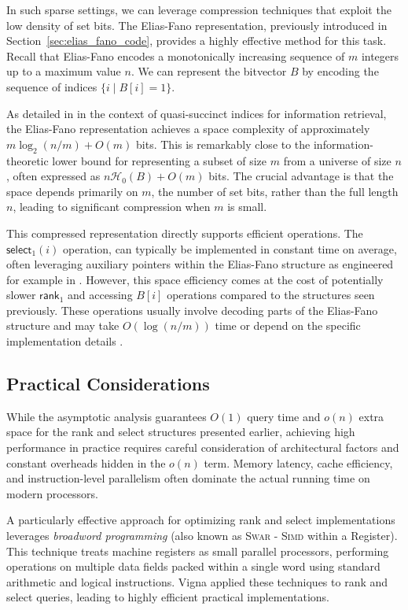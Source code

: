 In such sparse settings, we can leverage compression techniques that exploit the low density of set bits. The Elias-Fano representation, previously introduced in Section~\ref{sec:elias_fano_code}, provides a highly effective method for this task. Recall that Elias-Fano encodes a monotonically increasing sequence of $m$ integers up to a maximum value $n$. We can represent the bitvector $B$ by encoding the sequence of indices $\{ i \mid B[i]=1 \}$.

As detailed in \cite{vigna2013quasi} in the context of quasi-succinct indices for information retrieval, the Elias-Fano representation achieves a space complexity of approximately $m \log_2(n/m) + O(m)$ bits. This is remarkably close to the information-theoretic lower bound for representing a subset of size $m$ from a universe of size $n$, often expressed as $n\mathcal{H}_0(B) + O(m)$ bits. The crucial advantage is that the space depends primarily on $m$, the number of set bits, rather than the full length $n$, leading to significant compression when $m$ is small.

This compressed representation directly supports efficient operations. The $\textsf{select}_1(i)$ operation, can typically be implemented in constant time on average, often leveraging auxiliary pointers within the Elias-Fano structure as engineered for example in \cite{vigna2013quasi}. However, this space efficiency comes at the cost of potentially slower $\textsf{rank}_1$ and accessing $B[i]$ operations compared to the structures seen previously. These operations usually involve decoding parts of the Elias-Fano structure and may take $O(\log(n/m))$ time or depend on the specific implementation details \cite{navarro2016compact}.

\subsection{Practical Considerations} \label{subsec:practical_considerations}

While the asymptotic analysis guarantees $O(1)$ query time and $o(n)$ extra space for the \textsf{rank} and \textsf{select} structures presented earlier, achieving high performance in practice requires careful consideration of architectural factors and constant overheads hidden in the $o(n)$ term. Memory latency, cache efficiency, and instruction-level parallelism often dominate the actual running time on modern processors.

A particularly effective approach for optimizing \textsf{rank} and \textsf{select} implementations leverages \emph{broadword programming} (also known as \textsc{Swar} - \textsc{Simd} within a Register). This technique treats machine registers as small parallel processors, performing operations on multiple data fields packed within a single word using standard arithmetic and logical instructions. Vigna \cite{vigna2008broadword} applied these techniques to \textsf{rank} and \textsf{select} queries, leading to highly efficient practical implementations.


